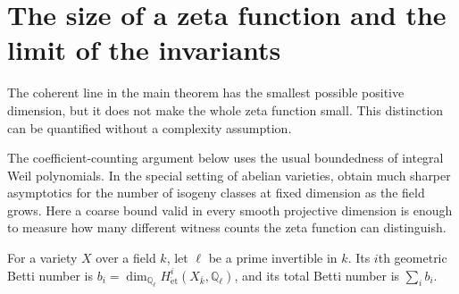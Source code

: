 \section{The size of a zeta function and the limit of the invariants}
\label{sec:small-zeta}
The coherent line in the main theorem has the smallest possible positive dimension, but it does not make the whole zeta function small. This distinction can be quantified without a complexity assumption.

The coefficient-counting argument below uses the usual boundedness of integral Weil polynomials. In the special setting of abelian varieties, \citet[Theorems~1.1--1.2]{root-dipippo-howe} obtain much sharper asymptotics for the number of isogeny classes at fixed dimension as the field grows. Here a coarse bound valid in every smooth projective dimension is enough to measure how many different witness counts the zeta function can distinguish.

For a variety $X$ over a field $k$, let $\ell$ be a prime invertible in $k$. Its $i$th geometric Betti number is $b_i=\dim_{\mathbb Q_\ell}H^i_{\mathrm{\acute et}}(X_{\bar k},\mathbb Q_\ell)$, and its total Betti number is $\sum_i b_i$.

